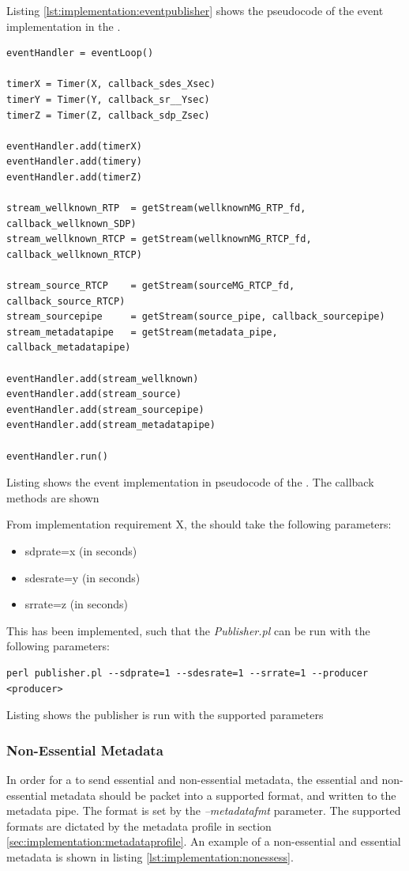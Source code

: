 Listing \ref{lst:implementation:eventpublisher} shows the pseudocode of the event implementation in the \pub{}.
\begin{listing}[H] 
\begin{verbatim}
eventHandler = eventLoop()
	
timerX = Timer(X, callback_sdes_Xsec)
timerY = Timer(Y, callback_sr__Ysec)
timerZ = Timer(Z, callback_sdp_Zsec)
	
eventHandler.add(timerX)
eventHandler.add(timery)
eventHandler.add(timerZ)
	
stream_wellknown_RTP  = getStream(wellknownMG_RTP_fd, callback_wellknown_SDP)
stream_wellknown_RTCP = getStream(wellknownMG_RTCP_fd, callback_wellknown_RTCP)

stream_source_RTCP    = getStream(sourceMG_RTCP_fd, callback_source_RTCP)
stream_sourcepipe     = getStream(source_pipe, callback_sourcepipe)
stream_metadatapipe   = getStream(metadata_pipe, callback_metadatapipe)	
	
eventHandler.add(stream_wellknown)
eventHandler.add(stream_source)
eventHandler.add(stream_sourcepipe)
eventHandler.add(stream_metadatapipe)
	
eventHandler.run()
\end{verbatim}
\caption{Listing shows the event implementation in pseudocode of the \pub{}. The callback methods are shown}
\label{lst:implementation:eventpublisher}
\end{listing}

From implementation requirement X, the \pub{} should take the following parameters:
\begin{itemize}
	\item sdprate=x (in seconds)
	\item sdesrate=y (in seconds)
	\item srrate=z (in seconds)
\end{itemize}

This has been implemented, such that the \textit{Publisher.pl} can be run with the following parameters:
\begin{listing}[h] 
\begin{verbatim}
perl publisher.pl --sdprate=1 --sdesrate=1 --srrate=1 --producer <producer>
\end{verbatim}
\caption{Listing shows the publisher is run with the supported parameters}
\label{lst:implementation:parameterspublisher}
\end{listing}

\subsubsection{Non-Essential Metadata} \label{sec:implementation:events:pub}
In order for a \pro{} to send essential and non-essential metadata, the essential and non-essential metadata should be packet into a supported format, and written to the metadata pipe. The format is set by the \textit{--metadatafmt} parameter. The supported formats are dictated by the metadata profile in section \ref{sec:implementation:metadataprofile}. An example of a non-essential and essential metadata is shown in listing \ref{lst:implementation:nonessess}.

